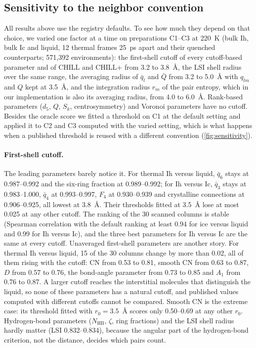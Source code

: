\documentclass[11pt,a4paper]{article}
\begin{document}
\subsection{Sensitivity to the neighbor convention}\label{sec:sensitivity}
All results above use the registry defaults. To see how much they depend on
that choice, we varied one factor at a time on preparations C1--C3 at 220~K
(bulk Ih, bulk Ic and liquid, 12 thermal frames 25~ps apart and their quenched
counterparts; 571,392 environments): the first-shell cutoff of every
cutoff-based parameter and of CHILL and CHILL+ from 3.2 to 3.8~\AA, the LSI
shell radius over the same range, the averaging radius of $\bar q_l$ and
$\bar Q$ from 3.2 to 5.0~\AA{} with $q_{lm}$ and $Q$ kept at 3.5~\AA, and the
integration radius $r_m$ of the pair entropy, which in our implementation is
also its averaging radius, from 4.0 to 6.0~\AA. Rank-based parameters ($d_5$,
$Q$, $S_k$, centrosymmetry) and Voronoi parameters have no cutoff. Besides the
oracle score we fitted a threshold on C1 at the default setting and applied it
to C2 and C3 computed with the varied setting, which is what happens when a
published threshold is reused with a different convention
(\cref{fig:sensitivity}).

\paragraph{First-shell cutoff.} The leading parameters barely notice it. For
thermal Ih versus liquid, $\bar q_6$ stays at 0.987--0.992 and the six-ring
fraction at 0.989--0.992; for Ih versus Ic, $\bar q_3$ stays at 0.983--1.000,
$\bar q_4$ at 0.993--0.997, $F_4$ at 0.930--0.939 and crystalline connections
at 0.906--0.925, all lowest at 3.8~\AA. Their thresholds fitted at 3.5~\AA{}
lose at most 0.025 at any other cutoff. The ranking of the 30 scanned columns
is stable (Spearman correlation with the default ranking at least 0.94 for
ice versus liquid and 0.99 for Ih versus Ic), and the three best parameters
for Ih versus Ic are the same at every cutoff. Unaveraged first-shell
parameters are another story. For thermal Ih versus liquid, 15 of the 30
columns change by more than 0.02, all of them rising with the cutoff: CN from
0.53 to 0.81, smooth CN from 0.63 to 0.87, $D$ from 0.57 to 0.76, the
bond-angle parameter from 0.73 to 0.85 and $A_1$ from 0.76 to 0.87. A larger
cutoff reaches the interstitial molecules that distinguish the liquid, so
none of these parameters has a natural cutoff, and published values computed
with different cutoffs cannot be compared. Smooth CN is the extreme case: its
threshold fitted with $r_0=3.5$~\AA{} scores only 0.50--0.69 at any other $r_0$.
Hydrogen-bond parameters ($N_\mathrm{HB}$, $\zeta$, ring fractions) and the LSI
shell radius hardly matter (LSI 0.832--0.834), because the angular part of the
hydrogen-bond criterion, not the distance, decides which pairs count.
\end{document}
